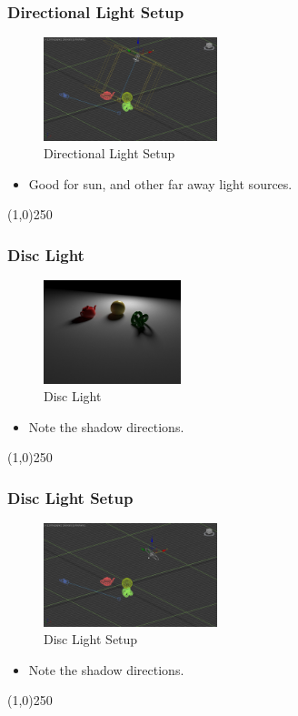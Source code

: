 \begin{frame}
	\frametitle{Directional Light Setup}
	\begin{figure}
		\centering
		\includegraphics[height=3cm]{./Lights/DirectionalLightSetup}
		\caption{Directional Light Setup}
		\label{fig:DirectionalLightSetup}
	\end{figure}
	\begin{itemize}
		\item Good for sun, and other far away light sources.
	\end{itemize}
\end{frame}
\begin{center}\line(1,0){250}\end{center}



\begin{frame}
	\frametitle{Disc Light}
	\begin{figure}
		\centering
		\includegraphics[height=3cm]{./Lights/Disc}
		\caption{Disc Light}
		\label{fig:DiscLight}
	\end{figure}
	\begin{itemize}
		\item Note the shadow directions.
	\end{itemize}
\end{frame}
\begin{center}\line(1,0){250}\end{center}


\begin{frame}
	\frametitle{Disc Light Setup}
	\begin{figure}
		\centering
		\includegraphics[height=3cm]{./Lights/DiscSetup}
		\caption{Disc Light Setup}
		\label{fig:DiscLightSetup}
	\end{figure}
	\begin{itemize}
		\item Note the shadow directions.
	\end{itemize}
\end{frame}
\begin{center}\line(1,0){250}\end{center}




